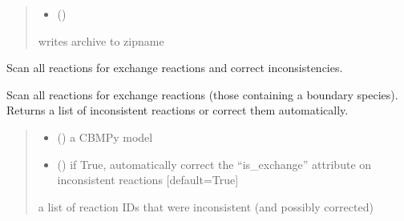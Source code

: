 \documentclass[letterpaper,12pt,english]{sphinxmanual}
\begin{document}
\begin{fulllineitems}
\begin{quote}
\begin{description}
\begin{itemize}
\item {} 
\sphinxAtStartPar
{} ()

\end{itemize}

\sphinxAtStartPar
{} \textendash{} writes archive to zipname

\end{description}\end{quote}

\end{fulllineitems}


\begin{fulllineitems}
\label{\detokenize{api/core:cbmpy.CBTools.checkExchangeReactions}}
\pysigstartsignatures
\pysiglinewithargsret
{}
{\sphinxparamcomma {}}
{}
\pysigstopsignatures
\sphinxAtStartPar
Scan all reactions for exchange reactions and correct inconsistencies.

\sphinxAtStartPar
Scan all reactions for exchange reactions (those containing a boundary species).
Returns a list of inconsistent reactions or correct them automatically.
\begin{quote}\begin{description}
\begin{itemize}
\item {} 
\sphinxAtStartPar
{} () \textendash{} a CBMPy model

\item {} 
\sphinxAtStartPar
{} (\sphinxstyleliteralemphasis{\sphinxupquote{, }}) \textendash{} if True, automatically correct the “is\_exchange”
attribute on inconsistent reactions {[}default=True{]}

\end{itemize}

\sphinxAtStartPar
{} \textendash{} a list of reaction IDs that were inconsistent (and possibly corrected)

\end{description}\end{quote}

\end{fulllineitems}
\end{document}
